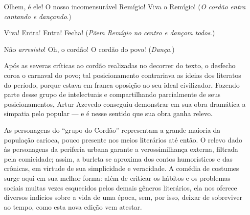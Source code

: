 \begin{hedraquote} 
 Olhem, é ele! O nosso incomensurável Remígio! Viva o
Remígio! (\textit{O cordão entra cantando e dançando}.)

 Viva! Entra! Entra! Fecha! (\textit{Põem Remígio no centro e
dançam todos}.)

 Não \textit{arresisto}! Oh, o cordão! O cordão do povo!
(\textit{Dança}.)
\end{hedraquote} 

Após as severas críticas ao cordão realizadas no decorrer do texto, o
desfecho coroa o carnaval do povo; tal posicionamento contrariava as
ideias dos literatos do período, porque estava em franca oposição ao
seu ideal civilizador. Fazendo parte desse grupo de intelectuais e
compartilhando parcialmente de seus posicionamentos, Artur Azevedo
conseguiu demonstrar em sua obra dramática a simpatia pelo popular --- e
é nesse sentido que sua obra ganha relevo. 

As personagens do “grupo do Cordão” representam a grande maioria da
população carioca, pouco presente nos meios literários até então. O
relevo dado às personagens da periferia urbana garante a
verossimilhança externa, filtrada pela comicidade; assim, a burleta se
aproxima dos contos humorísticos e das crônicas, em virtude de sua
simplicidade e veracidade. A comédia de costumes surge aqui em sua
melhor forma: além de criticar os hábitos e os problemas sociais muitas
vezes esquecidos pelos demais gêneros literários, ela nos oferece
diversos indícios sobre a vida de uma época, sem, por isso, deixar de
sobreviver ao tempo, como esta nova edição vem atestar.
